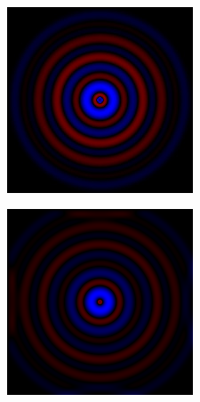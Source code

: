 \begin{figure}[p]
\begin{subfigure}[b]{0.3\textwidth}
        \label{fieldFig:2nd}
    \end{subfigure}
    ~ %
    \begin{subfigure}[b]{0.3\textwidth}
        \includegraphics[width=\textwidth]{include/graphics/image8}

        \label{fieldFig:3rd}
    \end{subfigure}
    
\bigskip
        \begin{subfigure}[b]{0.3\textwidth}
        \includegraphics[width=\textwidth]{include/graphics/image9}


\end{subfigure}
\end{figure}
